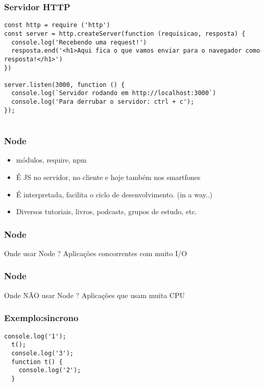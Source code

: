 \documentclass[14pt]{beamer}
\begin{document}
\begin{frame}[fragile]
 \frametitle{Servidor HTTP}
\begin{lstlisting}[basicstyle=\tiny\ttfamily]
const http = require ('http')
const server = http.createServer(function (requisicao, resposta) {
  console.log('Recebendo uma request!')
  resposta.end('<h1>Aqui fica o que vamos enviar para o navegador como resposta!</h1>')
})
 
server.listen(3000, function () {
  console.log(`Servidor rodando em http://localhost:3000`)
  console.log('Para derrubar o servidor: ctrl + c');
});


\end{lstlisting}

\end{frame}
\begin{frame}[fragile]
 \frametitle{Node}
\begin{itemize}
 \item módulos, require, npm
 \item É JS no servidor, no cliente e hoje também nos smartfones
 \item É interpretada, facilita o ciclo de desenvolvimento. (in a way..)
 \item Diversos tutoriais, livros, podcasts, grupos de estudo, etc.
\end{itemize}

\end{frame}
\begin{frame}[fragile]
 \frametitle{Node}
\begin{block}{Onde usar Node ?}
 Aplicações concorrentes com muito I/O
\end{block}

\end{frame}
\begin{frame}[fragile]
 \frametitle{Node}
\begin{block}{Onde NÃO usar Node ?}
 Aplicações que usam muita CPU
\end{block}

\end{frame}
\begin{frame}[fragile]
 \frametitle{Exemplo:sincrono}
\begin{lstlisting}[basicstyle=\tiny\ttfamily]
  console.log('1');
  t();
  console.log('3');
  function t() {
    console.log('2');
  }
\end{lstlisting}

\end{frame}
\end{document}
